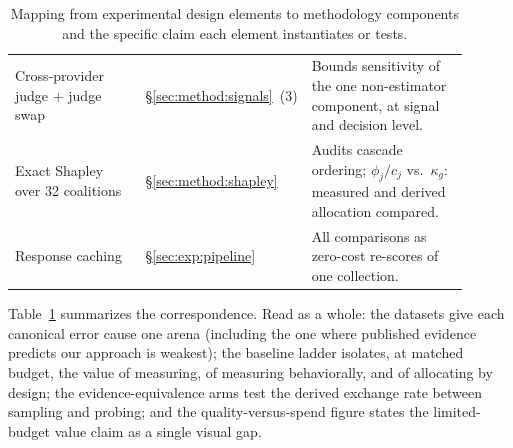 \documentclass[11pt]{article}
\begin{document}
\begin{table}[t]
\begin{tabular}{@{}p{0.30\linewidth} p{0.24\linewidth} p{0.36\linewidth}@{}}
Cross-provider judge $+$ judge swap & \S\ref{sec:method:signals}~(3) &
Bounds sensitivity of the one non-estimator component, at signal and decision level. \\
Exact Shapley over 32 coalitions & \S\ref{sec:method:shapley} &
Audits cascade ordering; $\phi_j/c_j$ vs.\ $\kappa_g$: measured and derived allocation compared. \\
Response caching & \S\ref{sec:exp:pipeline} &
All comparisons as zero-cost re-scores of one collection. \\
\bottomrule
\end{tabular}
\caption{Mapping from experimental design elements to methodology
components and the specific claim each element instantiates or tests.}
\label{tab:mapping}
\end{table}

Table~\ref{tab:mapping} summarizes the correspondence. Read as a
whole: the datasets give each canonical error cause one arena
(including the one where published evidence predicts our approach is
weakest); the baseline ladder isolates, at matched budget, the value
of measuring, of measuring behaviorally, and of allocating by design;
the evidence-equivalence arms test the derived exchange rate between
sampling and probing; and the quality-versus-spend figure states the
limited-budget value claim as a single visual gap.



\end{document}
